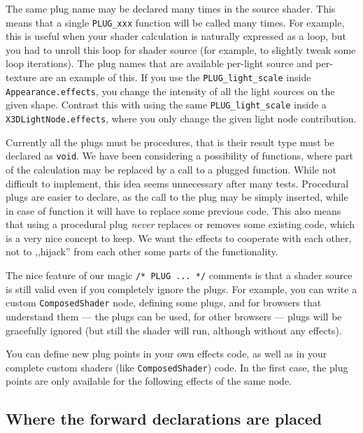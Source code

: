 \documentclass{egpubl}
\begin{document}
The same plug name may be declared many times in the source shader.
This means that a single \texttt{PLUG\_xxx} function will be called
many times. For example, this is useful when your shader calculation is naturally
expressed as a loop, but you had to unroll this loop for shader source
(for example, to slightly tweak some loop iterations).
The plug names that are available per-light source and per-texture
are an example of this.
If you use the \texttt{PLUG\_light\_scale}
inside \texttt{Appearance.effects}, you change the intensity
of all the light sources on the given shape. Contrast this with using
the same \texttt{PLUG\_light\_scale} inside a \texttt{X3DLightNode.effects},
where you only change the given light node contribution.

Currently all the plugs must be procedures, that is their result type
must be declared as \texttt{void}. We have been considering
a possibility of functions, where part of the calculation may be replaced
by a call to a plugged function. While not difficult to implement,
this idea seems unnecessary after many tests.
Procedural plugs are easier to declare, as the call to the plug
may be simply inserted, while in case of function it will have to replace
some previous code. This also means that using a procedural plug
\textit{never} replaces or removes some existing code, which is a very nice
concept to keep. We want the effects to cooperate with each other,
not to ,,hijack'' from each other some parts of the functionality.

The nice feature of our magic \texttt{/* PLUG ... */} comments is that a shader source
is still valid even if you completely ignore the plugs. For example,
you can write a custom \texttt{ComposedShader} node, defining some plugs,
and for browsers that understand them --- the plugs can be used,
for other browsers --- plugs will be gracefully ignored (but still
the shader will run, although without any effects).

You can define new plug points in your own effects code, as well as in your
complete custom shaders (like \texttt{ComposedShader}) code.
In the first case, the plug points
are only available for the following effects of the same node.

\subsection{Where the forward declarations are placed}
\end{document}
